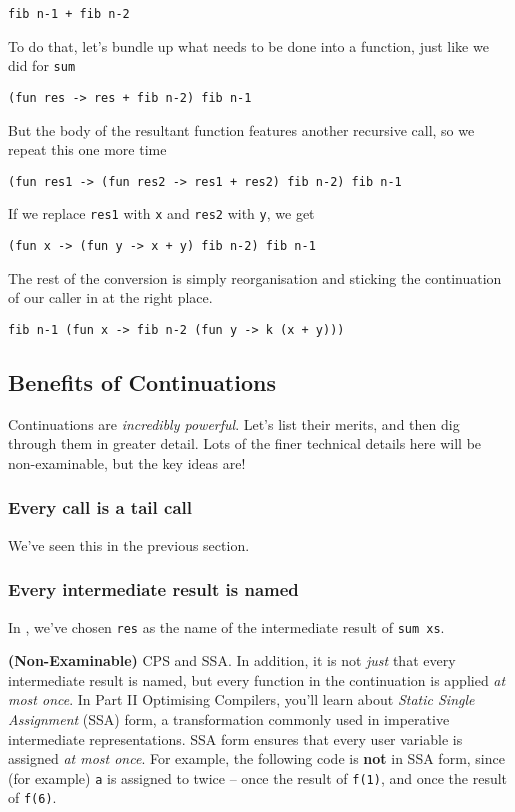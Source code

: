 \begin{verbatim}
fib n-1 + fib n-2
\end{verbatim}
To do that, let's bundle up what needs to be done into a function, just like we did for \texttt{sum}
\begin{verbatim}
(fun res -> res + fib n-2) fib n-1 
\end{verbatim}
But the body of the resultant function features another recursive call, so we repeat this one more time
\begin{verbatim}
(fun res1 -> (fun res2 -> res1 + res2) fib n-2) fib n-1 
\end{verbatim}
If we replace \texttt{res1} with \texttt{x} and \texttt{res2} with \texttt{y}, we get
\begin{verbatim}
(fun x -> (fun y -> x + y) fib n-2) fib n-1 
\end{verbatim}
The rest of the conversion is simply reorganisation and sticking the continuation of our caller in at the right place.
\begin{verbatim}
fib n-1 (fun x -> fib n-2 (fun y -> k (x + y))) 
\end{verbatim}


\subsection{Benefits of Continuations}\label{subsection:cps-benefits}
Continuations are \emph{incredibly powerful}. Let's list their merits, and then dig through them in greater detail. Lots of the finer technical details here will be non-examinable, but the key ideas are!

\subsubsection{Every call is a tail call}
We've seen this in the previous section.

\subsubsection{Every intermediate result is named}
In , we've chosen \texttt{res} as the name of the intermediate result of \texttt{sum xs}.

{\sffamily \textbf{(Non-Examinable)} CPS and SSA.} In addition, it is not \emph{just} that every intermediate result is named, but every function in the continuation is applied \emph{at most once}. In {\sffamily Part II Optimising Compilers}, you'll learn about \textit{Static Single Assignment} (SSA) form, a transformation commonly used in imperative intermediate representations. SSA form ensures that every user variable is assigned \textit{at most once}. For example, the following code is \textbf{not} in SSA form, since (for example) \texttt{a} is assigned to twice -- once the result of \texttt{f(1)}, and once the result of \texttt{f(6)}.

